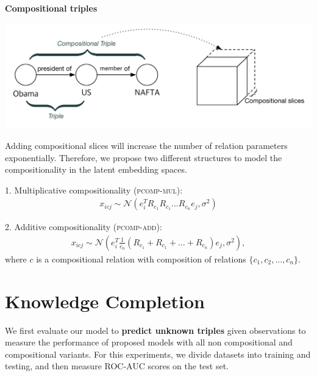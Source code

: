 \documentclass[a0,landscape]{a0poster}
\begin{document}
\begin{multicols}{3}
\vspace{.5cm}
\noindent\textbf{Compositional triples}

\begin{center}
\includegraphics[width=.9\linewidth]{./figures/composition.pdf}
\end{center}

Adding compositional slices will increase the number of relation parameters exponentially. Therefore, we propose two different structures to model the compositionality in the latent embedding spaces.

1. Multiplicative compositionality (\textsc{pcomp-mul}):
\begin{align}
x_{icj} \sim \mathcal{N}(e_i^T R_{c_1} R_{c_1} \dots R_{c_n} e_j,\sigma^2)
\end{align}

2. Additive compositionality (\textsc{pcomp-add}):
\begin{align}
x_{icj} \sim \mathcal{N}(e_i^T \frac{1}{c_n} (R_{c_1} + R_{c_1} + \dots + R_{c_n}) e_j,\sigma^2),
\end{align}
where $c$ is a compositional relation with composition of relations $\{c_1, c_2, ..., c_n\}$.


\section{Knowledge Completion}

We first evaluate our model to \textbf{predict unknown triples} given observations to measure the performance of proposed models with all non compositional and compositional variants. For this experiments, we divide datasets into training and testing, and then measure ROC-AUC scores on the test set.

\vspace{.5cm}


\end{multicols}
\end{document}
